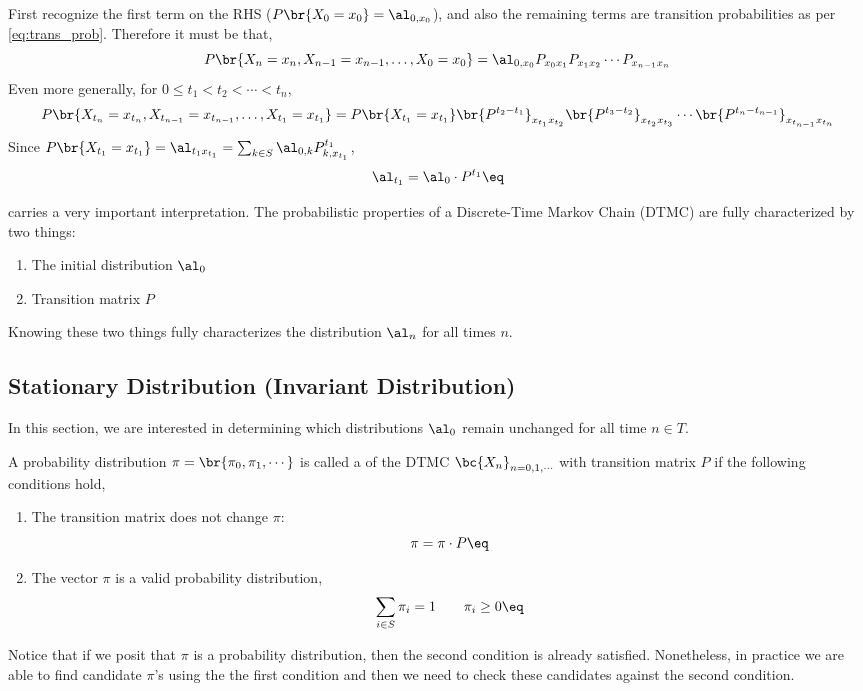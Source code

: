 \documentclass{article}
\newcommand{\val}[1]{X_{#1} = x_{#1}}
\begin{document}
First recognize the first term on the RHS ($P\br{X_{0} = x_{0}} = \al_{0, x_0}$), and also the remaining terms are transition probabilities as per \cref{eq:trans_prob}. Therefore it must be that,
\[ P\br{X_n=x_n, X_{n-1}=x_{n-1}, \ldots, X_{0}=x_{0}} = \al_{0, x_0} P_{x_0x_1}P_{x_1x_2}\cdots P_{x_{n-1}x_n} \]
Even more generally, for $0 \leq t_1 < t_2 < \cdots < t_n$,
\[ P\br{\val{t_n}, \val{t_{n-1}}, \ldots, \val{t_{1}}} = P\br{\val{t_1}} \br{P^{t_2 - t_1}}_{x_{t_1}x_{t_2}}\br{P^{t_3 - t_2}}_{x_{t_2}x_{t_3}}\cdots\br{P^{t_{n} - t_{n-1}}}_{x_{t_{n-1}}x_{t_{n}}}  \]
Since $P\br{\val{t_1}} = \al_{t_1 x_{t_1}} = \sum_{k \in S} \al_{0, k} P^{t_1}_{k, x_{t_1}}$,
\[ \al_{t_1} = \al_{0} \cdot P^{t_1} \eq \label{eq:distribution_fundamentals} \]
\begin{remark}
 carries a very important interpretation. The probabilistic properties of a Discrete-Time Markov Chain (DTMC) are fully characterized by two things:
\begin{enumerate}
    \item The initial distribution $\al_{0}$
    \item Transition matrix $P$
\end{enumerate}
Knowing these two things fully characterizes the distribution $\al_{n}$ for all times $n$.
\end{remark}

\subsection{Stationary Distribution (Invariant Distribution)}
In this section, we are interested in determining which distributions $\al_{0}$ remain unchanged for all time $n \in T$.
\begin{definition}
    A probability distribution $\pi = \br{\pi_0, \pi_1, \cdots}$ is called a  of the DTMC $\bc{X_n}_{n = 0,1, \cdots}$ with transition matrix $P$ if the following conditions hold,
    \begin{enumerate}
        \item The transition matrix does not change $\pi$:
        \[  \pi = \pi \cdot P \eq \label{eq:invariant}\]
        \item The vector $\pi$ is a valid probability distribution,
        \[ \sum_{i \in S} \pi_i = 1 \qquad \pi_i \geq 0 \eq \label{eq:prob_dist_requirements}\]
    \end{enumerate}
\end{definition}
Notice that if we posit that $\pi$ is a probability distribution, then the second condition is already satisfied. Nonetheless, in practice we are able to find candidate $\pi$'s using the the first condition and then we need to check these candidates against the second condition. \\
\end{document}
